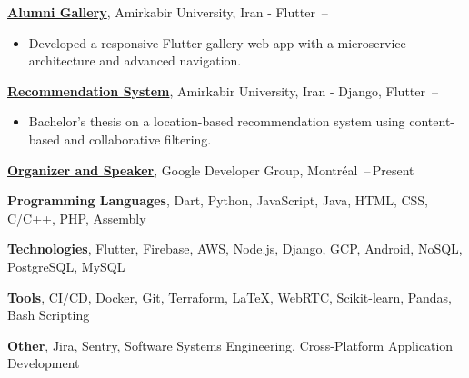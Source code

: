 \documentclass[letterpaper,11pt]{article}
\begin{document}
\Gap
\href{https://gallery.yazdi.dev}
{\textbf{Alumni Gallery}}, Amirkabir University, Iran - Flutter
\hfill {}\,--\,
\begin{itemize}[leftmargin=*, noitemsep, topsep=0pt, partopsep=0pt]
    \item Developed a responsive Flutter gallery web app with a microservice architecture and advanced navigation.
\end{itemize}

\Gap
\href{https://raw.githubusercontent.com/aliyazdi75/Resume/main/BScThesis-Abstract.pdf?token=GHSAT0AAAAAACNTPCQKF3DMPOJ3YIMG3IPUZO5MTGQ}
{\textbf{Recommendation System}}, Amirkabir University, Iran - Django, Flutter
\hfill {}\,--\,
\begin{itemize}[leftmargin=*, noitemsep, topsep=0pt, partopsep=0pt]
    \item Bachelor's thesis on a location-based recommendation system using content-based and collaborative filtering.
\end{itemize}



\href{https://gdg.community.dev/gdg-montreal}
{\textbf{Organizer and Speaker}}, Google Developer Group, Montréal
\hfill {}\,--\,Present



\textbf{Programming Languages}, Dart, Python, JavaScript, Java, HTML, CSS, C/C++, PHP, Assembly

\Gap
\textbf{Technologies}, Flutter, Firebase, AWS, Node.js, Django, GCP, Android, NoSQL, PostgreSQL, MySQL

\Gap
\textbf{Tools}, CI/CD, Docker, Git, Terraform, \LaTeX, WebRTC, Scikit-learn, Pandas, Bash Scripting

\Gap
\textbf{Other}, Jira, Sentry, Software Systems Engineering, Cross-Platform Application Development

\end{document}
